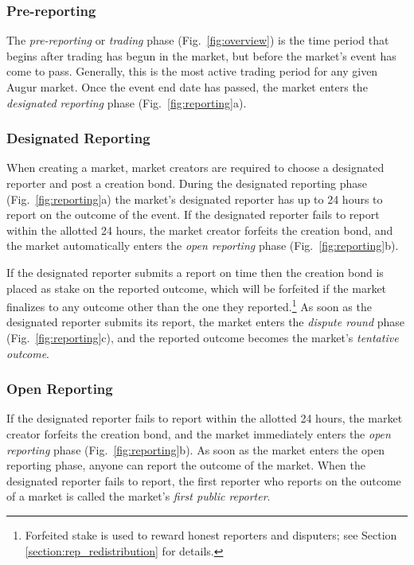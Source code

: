\documentclass[floatfix,reprint,nofootinbib,amsmath,amssymb,epsfig,pre,floats,letterpaper,groupedaffiliation]{revtex4-1}
\theoremstyle{definition}
\theoremstyle{definition}
\begin{document}
\subsubsection{Pre-reporting}

The \textit{pre-reporting} or \textit{trading} phase (Fig.~\ref{fig:overview}) is the time period that begins after trading has begun in the market, but before the market's event has come to pass.  Generally, this is the most active trading period for any given Augur market.  Once the event end date has passed, the market enters the \textit{designated reporting} phase (Fig.~\ref{fig:reporting}a).

\subsubsection{Designated Reporting}

When creating a market, market creators are required to choose a designated reporter and post a creation bond.  During the designated reporting phase (Fig.~\ref{fig:reporting}a) the market's designated reporter has up to 24 hours to report on the outcome of the event.  If the designated reporter fails to report within the allotted 24 hours, the market creator forfeits the creation bond, and the market automatically enters the \textit{open reporting} phase (Fig.~\ref{fig:reporting}b).

If the designated reporter submits a report on time then the creation bond is placed as stake on the reported outcome, which will be forfeited if the market finalizes to any outcome other than the one they reported.\footnote{Forfeited stake is used to reward honest reporters and disputers; see Section \ref{section:rep_redistribution} for details.}  As soon as the designated reporter submits its report, the market enters the \textit{dispute round} phase (Fig.~\ref{fig:reporting}c), and the reported outcome becomes the market's \textit{tentative outcome}.

\subsubsection{Open Reporting}\label{section:open_reporting}

If the designated reporter fails to report within the allotted 24 hours, the market creator forfeits the creation bond, and the market immediately enters the \textit{open reporting} phase (Fig.~\ref{fig:reporting}b).  As soon as the market enters the open reporting phase, anyone can report the outcome of the market.  When the designated reporter fails to report, the first reporter who reports on the outcome of a market is called the market's \textit{first public reporter}.
\end{document}
